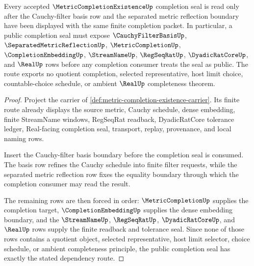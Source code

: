 \begin{theorem}
\label{thm:metric-completion-existence-cauchy-filter-route}
Every accepted $\MetricCompletionExistenceUp$ completion seal is read only after the Cauchy-filter basis row and the separated metric reflection boundary have been displayed with the same finite completion packet. In particular, a public completion seal must expose $\CauchyFilterBasisUp$, $\SeparatedMetricReflectionUp$, $\MetricCompletionUp$, $\CompletionEmbeddingUp$, $\StreamNameUp$, $\RegSeqRatUp$, $\DyadicRatCoreUp$, and $\RealUp$ rows before any completion consumer treats the seal as public. The route exports no quotient completion, selected representative, host limit choice, countable-choice schedule, or ambient $\RealUp$ completeness theorem.
\end{theorem}
\begin{proof}
Project the carrier of \autoref{def:metric-completion-existence-carrier}. Its finite route already displays the source metric, Cauchy schedule, dense embedding, finite StreamName windows, RegSeqRat readback, DyadicRatCore tolerance ledger, Real-facing completion seal, transport, replay, provenance, and local naming rows.

Insert the Cauchy-filter basis boundary before the completion seal is consumed. The basis row refines the Cauchy schedule into finite filter requests, while the separated metric reflection row fixes the equality boundary through which the completion consumer may read the result.

The remaining rows are then forced in order: $\MetricCompletionUp$ supplies the completion target, $\CompletionEmbeddingUp$ supplies the dense embedding boundary, and the $\StreamNameUp$, $\RegSeqRatUp$, $\DyadicRatCoreUp$, and $\RealUp$ rows supply the finite readback and tolerance seal. Since none of those rows contains a quotient object, selected representative, host limit selector, choice schedule, or ambient completeness principle, the public completion seal has exactly the stated dependency route.
\end{proof}

